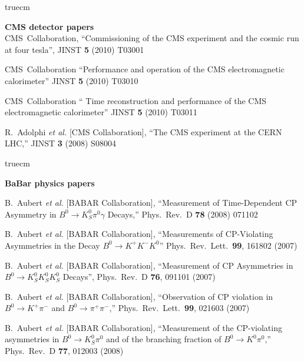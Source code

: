  truecm

{\bf CMS detector papers}
\\

  CMS~Collaboration,
  ``Commissioning of the CMS experiment and the cosmic run at four tesla'',
  JINST {\bf 5} (2010) T03001

 CMS~Collaboration
 ``Performance and operation of the CMS electromagnetic calorimeter''
 JINST {\bf 5} (2010) T03010

 CMS~Collaboration
 `` Time reconstruction and performance of the CMS electromagnetic calorimeter''
 JINST {\bf 5} (2010) T03011

  R.~Adolphi {\it et al.}  [CMS Collaboration],
  ``The CMS experiment at the CERN LHC,''
  JINST {\bf 3} (2008) S08004





 truecm

{\bf BaBar physics papers}

  B.~Aubert {\it et al.}  [BABAR Collaboration],
  ``Measurement of Time-Dependent CP Asymmetry in $B^0 \to K^0_{S} \pi^0
  \gamma$ Decays,''
  Phys.\ Rev.\  D {\bf 78} (2008) 071102


  B.~Aubert {\it et al.}  [BABAR Collaboration],
  ``Measurements of CP-Violating Asymmetries in the Decay $B^0 \to K^+K^-K^0$''
  Phys.\ Rev.\ Lett.\  {\bf 99}, 161802 (2007)

  B.~Aubert {\it et al.}  [BABAR Collaboration],
  ``Measurement of CP Asymmetries in $B^0 \to K^0_S K^0_S K^0_S$ Decays'',
  Phys.\ Rev.\  D {\bf 76}, 091101 (2007)

  B.~Aubert {\it et al.}  [BABAR Collaboration],
  ``Observation of CP violation in $B^0 \to K^{+} \pi^{-}$ and $B^0 \to \pi^{+} \pi^{-}$,''
  Phys.\ Rev.\ Lett.\  {\bf 99}, 021603 (2007)

  B.~Aubert {\it et al.}  [BABAR Collaboration],
  ``Measurement of the CP-violating asymmetries in $B^0 \to K^0_{S} \pi^0$ and of the branching fraction of $B^0 \to K^0 \pi^0$,''
  Phys.\ Rev.\  D {\bf 77}, 012003 (2008)

